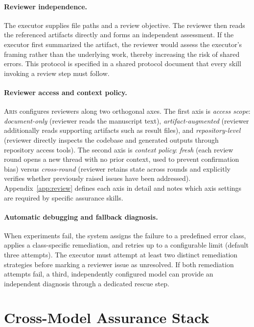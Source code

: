 \documentclass{article}
\newcommand{\aris}{\textsc{Aris}}
\theoremstyle{remark}
\begin{document}
\paragraph{Reviewer independence.}
The executor supplies file paths and a review objective.
The reviewer then reads the referenced artifacts directly and forms an independent assessment.
If the executor first summarized the artifact, the reviewer would assess the executor's framing rather than the underlying work, thereby increasing the risk of shared errors.
This protocol is specified in a shared protocol document that every skill invoking a review step must follow.

\paragraph{Reviewer access and context policy.}
\aris{} configures reviewers along two orthogonal axes.
The first axis is \emph{access scope}: \emph{document-only} (reviewer reads the manuscript text), \emph{artifact-augmented} (reviewer additionally reads supporting artifacts such as result files), and \emph{repository-level} (reviewer directly inspects the codebase and generated outputs through repository access tools).
The second axis is \emph{context policy}: \emph{fresh} (each review round opens a new thread with no prior context, used to prevent confirmation bias) versus \emph{cross-round} (reviewer retains state across rounds and explicitly verifies whether previously raised issues have been addressed).
Appendix~\ref{app:review} defines each axis in detail and notes which axis settings are required by specific assurance skills.

\paragraph{Automatic debugging and fallback diagnosis.}
When experiments fail, the system assigns the failure to a predefined error class, applies a class-specific remediation, and retries up to a configurable limit (default three attempts).
The executor must attempt at least two distinct remediation strategies before marking a reviewer issue as unresolved.
If both remediation attempts fail, a third, independently configured model can provide an independent diagnosis through a dedicated rescue step.

\section{Cross-Model Assurance Stack}
\label{sec:assurance}
\end{document}
